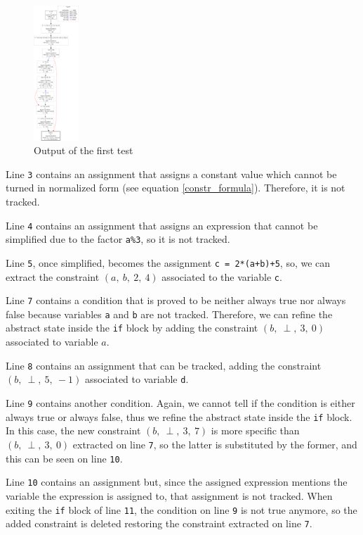\documentclass{article}
\newcommand{\spc}{\:}
\newcommand{\constraint}[4]{(#1,\spc #2,\spc #3,\spc #4)}
\newcommand{\linenum}[1]{\texttt{#1}}
\begin{document}
\begin{figure}
    \centering
    \includegraphics[width=0.15\textwidth]{test1.pdf}
    \caption{Output of the first test}
\end{figure}

Line \linenum{3} contains an assignment that assigns a constant value which cannot be turned in normalized form (see equation \ref{constr_formula}). Therefore, it is not tracked.

Line \linenum{4} contains an assignment that assigns an expression that cannot be simplified due to the factor \texttt{a\%3}, so it is not tracked.

Line \linenum{5}, once simplified, becomes the assignment \texttt{c = 2*(a+b)+5}, so, we can extract the constraint $\constraint{a}{b}{2}{4}$ associated to the variable \texttt{c}.

Line \linenum{7} contains a condition that is proved to be neither always true nor always false because variables \texttt{a} and \texttt{b} are not tracked.
Therefore, we can refine the abstract state inside the \texttt{if} block by adding the constraint $\constraint{b}{\perp}{3}{0}$ associated to variable $a$.

Line \linenum{8} contains an assignment that can be tracked, adding the constraint $\constraint{b}{\perp}{5}{-1}$ associated to variable \texttt{d}.

Line \linenum{9} contains another condition. Again, we cannot tell if the condition is either always true or always false, thus we refine the abstract state inside the \texttt{if} block. In this case, the new constraint $\constraint{b}{\perp}{3}{7}$ is more specific than $\constraint{b}{\perp}{3}{0}$ extracted on line \linenum{7}, so the latter is substituted by the former, and this can be seen on line \linenum{10}.

Line \linenum{10} contains an assignment but, since the assigned expression mentions the variable the expression is assigned to, that assignment is not tracked.
When exiting the \texttt{if} block of line \linenum{11}, the condition on line \linenum{9} is not true anymore, so the added constraint is deleted restoring the constraint extracted on line \linenum{7}.
\end{document}
